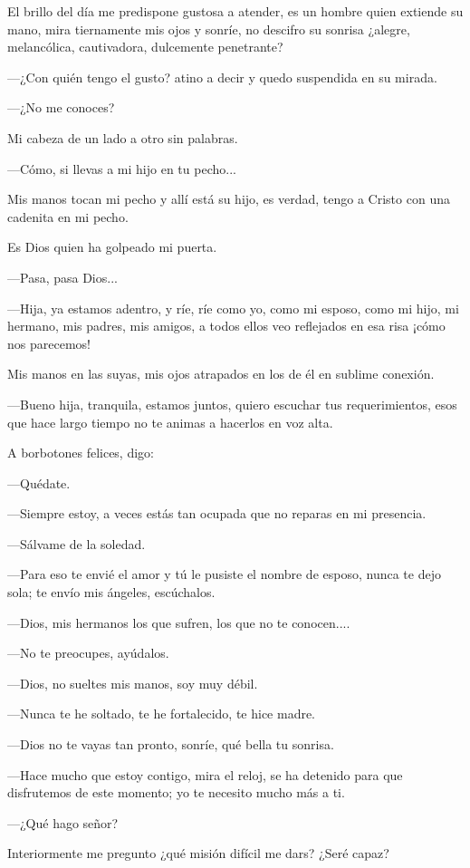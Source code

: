 \documentclass[11pt,twoside,openright,a5paper]{book}
\begin{document}
El brillo del día me predispone gustosa a atender, es un hombre quien extiende su mano, mira tiernamente mis ojos y sonríe, no descifro su sonrisa ¿alegre, melancólica, cautivadora, dulcemente penetrante?

---¿Con quién tengo el gusto? atino a decir y  quedo suspendida en su mirada.

---¿No me conoces? 

Mi cabeza de un lado a otro sin palabras.

---Cómo, si llevas a mi hijo en tu pecho...

Mis manos tocan mi pecho  y allí está su hijo, es verdad, tengo a Cristo con una cadenita en mi pecho.

Es Dios quien ha golpeado mi puerta.

---Pasa, pasa Dios...

---Hija, ya estamos adentro, y ríe, ríe como yo, como mi esposo, como mi hijo, mi hermano, mis padres, mis amigos, a todos ellos veo reflejados en esa risa ¡cómo nos parecemos!

Mis manos en las suyas, mis ojos atrapados en los de él en sublime conexión.

---Bueno hija, tranquila, estamos juntos, quiero escuchar tus requerimientos, esos que hace largo tiempo no te animas a hacerlos en voz alta.

A borbotones felices, digo:

---Quédate.

---Siempre estoy, a veces estás tan ocupada que no reparas en mi presencia.

---Sálvame de la soledad.

---Para eso te envié el amor y tú le pusiste el nombre de esposo, nunca te dejo sola; te envío mis ángeles, escúchalos.

---Dios, mis hermanos los que sufren,  los que no te conocen....

---No te preocupes, ayúdalos.

---Dios, no sueltes mis manos, soy muy débil.

---Nunca te he soltado, te he fortalecido, te hice madre.

---Dios no te vayas tan pronto, sonríe, qué bella tu sonrisa.

---Hace mucho que estoy contigo, mira el reloj, se ha detenido para que disfrutemos de este momento; yo te necesito mucho más a ti.

---¿Qué hago señor?

Interiormente me pregunto ¿qué misión difícil me dars? ¿Seré capaz?
\end{document}
